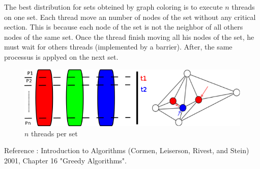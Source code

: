 The best distribution for sets obteined by graph coloring is to execute $n$ threads on one set. Each thread move an number of nodes of the set without any critical section. This is because each node of the set is not the neighbor of all others nodes of the same set. Once the thread finish moving all his nodes of the set, he must wait for others threads (implemented by a barrier). After, the same processus is applyed on the next set.

\begin{figure}[!h]
\centering
\includegraphics[scale=0.5]{img/distrib.png}
\caption{$n$ threads per set}
\end{figure}


Reference : Introduction to Algorithms (Cormen, Leiserson, Rivest, and Stein) 2001, Chapter 16 "Greedy Algorithms".
